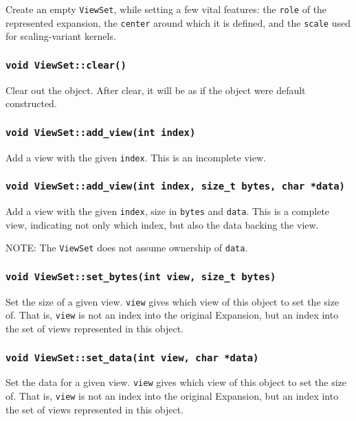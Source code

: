 Create an empty \texttt{ViewSet}, while setting a few vital features: the
\texttt{role} of the represented expansion, the \texttt{center} around which it
is defined, and the \texttt{scale} used for scaling-variant kernels.

\subsubsection{\texttt{void ViewSet::clear()}}

Clear out the object. After clear, it will be as if the object were default
constructed.

\subsubsection{\texttt{void ViewSet::add\_view(int index)}}

Add a view with the given \texttt{index}. This is an incomplete view.

\subsubsection{\texttt{void ViewSet::add\_view(int index, size\_t bytes, char *data)}}

Add a view with the given \texttt{index}, size in \texttt{bytes} and
\texttt{data}. This is a complete view, indicating not only which index, but
also the data backing the view.

NOTE: The \texttt{ViewSet} does not assume ownership of \texttt{data}.

\subsubsection{\texttt{void ViewSet::set\_bytes(int view, size\_t bytes)}}

Set the size of a given view. \texttt{view} gives which view of this object to
set the size of. That is, \texttt{view} is not an index into the original
Expansion, but an index into the set of views represented in this object.

\subsubsection{\texttt{void ViewSet::set\_data(int view, char *data)}}

Set the data for a given view. \texttt{view} gives which view of this object to
set the size of. That is, \texttt{view} is not an index into the original
Expansion, but an index into the set of views represented in this object.

